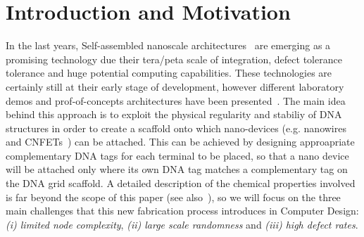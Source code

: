 
\section{Introduction and Motivation}


In the last years, Self-assembled nanoscale architectures~\cite{winfree1998, yan2003}
are emerging as a promising technology due their tera/peta scale of
integration, defect tolerance tolerance and huge potential computing
capabilities. These technologies are certainly still at
their early stage of development, however different laboratory demos and
prof-of-concepts architectures have been presented~\cite{patwardhan2004, patwardhan2006_1, pistol2009}.
The main idea behind this approach is to exploit the physical regularity and
stabiliy of DNA structures in order to create a scaffold onto which
nano-devices (e.g. nanowires and CNFETs~\cite{bachtold2001, tans1998, cui2001}) can be
attached. This can be achieved by designing approapriate complementary DNA tags for
each terminal to be placed, so that a nano device will be attached
only where its own DNA tag matches a complementary tag on the DNA grid
scaffold.
%
A detailed description of the chemical properties involved is far
beyond the scope of this paper (see also~\cite{braun1998, seeman1999}), so we will focus on
the three main challenges that this new fabrication process introduces
in Computer Design: \emph{(i) limited node complexity}, \emph{(ii) large scale
randomness} and \emph{(iii) high defect rates}.  

